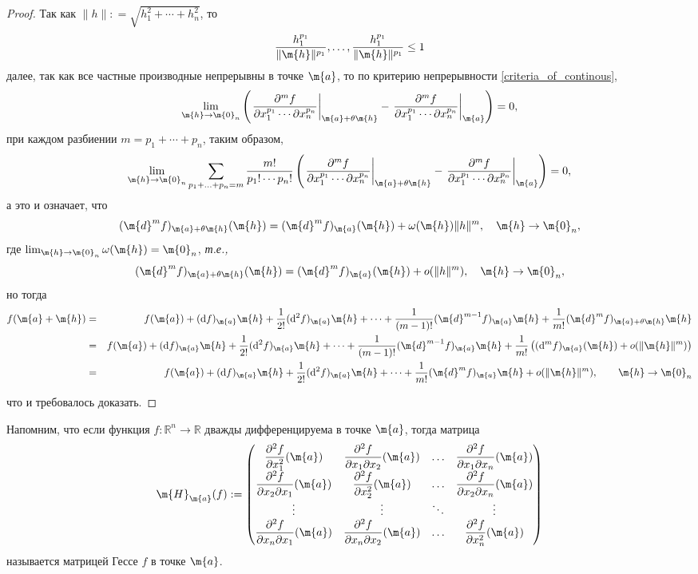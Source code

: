 \begin{proof}
Так как $\| h \|: = \sqrt{h_1^2 + \cdots + h_n^2}$, то 
\[
 \frac{h_1^{p_1}}{\| \m{h}\|^{p_1}}, \ldots, \frac{h_1^{p_1}}{\| \m{h}\|^{p_1}} \le 1 
\]
далее, так как все частные производные непрерывны в точке $\m{a}$, то по критерию непрерывности \ref{criteria_of_continous},
\[
 \lim_{\m{h} \to \m{0}_n} \left( \left.\frac{\partial^m f}{\partial x_1^{p_1} \cdots \partial x_n^{p_n}}\right|_{\m{a}+\theta \m{h}} - \left.\frac{\partial^m f}{\partial x_1^{p_1} \cdots \partial x_n^{p_n}}\right|_{\m{a}} \right) = 0, 
\]
при каждом разбиении $m = p_1 + \cdots + p_n$, таким образом, 
\[
 \lim_{\m{h} \to \m{0}_n} \sum_{p_1 + \ldots + p_n = m} \dfrac{m!}{p_1! \cdots p_n!}\left( \left.\frac{\partial^m f}{\partial x_1^{p_1} \cdots \partial x_n^{p_n}}\right|_{\m{a}+\theta \m{h}} - \left.\frac{\partial^m f}{\partial x_1^{p_1} \cdots \partial x_n^{p_n}}\right|_{\m{a}} \right) = 0,
\]
а это и означает, что 
\[
 (\m{d}^{m}f)_{\m{a}+ \theta \m{h}}(\m{h}) = (\m{d}^{m}f)_{\m{a}}(\m{h}) + \omega(\m{h}) \|h\|^m, \quad \m{h} \to \m{0}_n,
\]
где $\lim_{\m{h} \to \m{0}_n} \omega(\m{h}) = \m{0}_n$, \textit{т.е.,}
\[
 (\m{d}^{m}f)_{\m{a}+ \theta \m{h}}(\m{h}) = (\m{d}^{m}f)_{\m{a}}(\m{h}) + o(\|h\|^m), \quad \m{h} \to \m{0}_n,
\]
но тогда
\begin{eqnarray*}
    f(\m{a} + \m{h}) &=& f(\m{a}) + (\mathrm{d}f)_\m{a} \m{h} + \frac{1}{2!} (\mathrm{d}^2f)_\m{a}\m{h} + \cdots + \frac{1}{(m-1)!} (\m{d}^{m-1}f)_\m{a}\m{h} + \frac{1}{m!} (\m{d}^{m}f)_{\m{a}+ \theta \m{h}}\m{h} \\
    &=&f(\m{a}) + (\mathrm{d}f)_\m{a} \m{h} + \frac{1}{2!} (\mathrm{d}^2f)_\m{a}\m{h} + \cdots + \frac{1}{(m-1)!} (\m{d}^{m-1}f)_\m{a}\m{h} + \frac{1}{m!}\left( (\mathrm{d}^mf)_\m{a} (\m{h}) + o(\|\m{h}\|^m) \right) \\
    &=&f(\m{a}) + (\mathrm{d}f)_\m{a} \m{h} + \frac{1}{2!} (\mathrm{d}^2f)_\m{a}\m{h} + \cdots + \frac{1}{m!} (\m{d}^mf)_\m{a}\m{h} + o(\| \m{h} \|^m), \qquad \m{h} \to \m{0}_n
\end{eqnarray*}

что и требовалось доказать.
\end{proof}

Напомним, что если функция $f:\mathbb{R}^n \to \mathbb{R}$ дважды дифференцируема в точке $\m{a}$, тогда матрица
    \[
     \m{H}_\m{a}(f): = \begin{pmatrix}
         \dfrac{\partial^2 f}{\partial x_1^2}(\m{a}) & \dfrac{\partial^2 f}{\partial x_1 \partial x_2}(\m{a}) &\ldots & \dfrac{\partial^2 f}{\partial x_1 \partial x_n}(\m{a}) \\
         \dfrac{\partial^2 f}{\partial x_2 \partial x_1}(\m{a}) & \dfrac{\partial^2 f}{\partial x_2^2}(\m{a}) & \ldots & \dfrac{\partial^2 f}{\partial x_2 \partial x_n}(\m{a}) \\
         \vdots & \vdots & \ddots & \vdots \\
         \dfrac{\partial^2 f}{\partial x_n \partial x_1}(\m{a}) & \dfrac{\partial^2 f}{\partial x_n \partial x_2}(\m{a}) & \ldots &\dfrac{\partial^2 f}{ \partial x_n^2}(\m{a})
     \end{pmatrix}
    \]
    называется матрицей Гессе $f$ в точке $\m{a}$.

